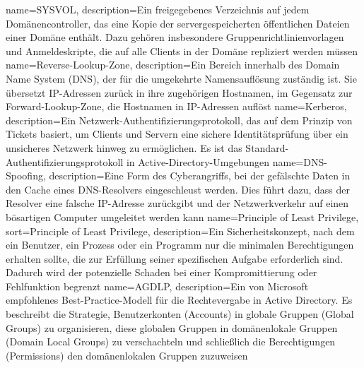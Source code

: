 {
	name={SYSVOL},
	description={Ein frei\-ge\-ge\-be\-nes Ver\-zeich\-nis auf je\-dem Do\-mä\-nen\-con\-trol\-ler, das eine Ko\-pie der ser\-ver\-ge\-spei\-cher\-ten öf\-fent\-li\-chen Da\-tei\-en ei\-ner Do\-mä\-ne ent\-hält. Da\-zu ge\-hö\-ren ins\-be\-son\-de\-re Grup\-pen\-richt\-li\-ni\-en\-vor\-la\-gen und An\-mel\-de\-skrip\-te, die auf alle Cli\-ents in der Do\-mä\-ne re\-pli\-ziert wer\-den müs\-sen}
}
{
	name={Re\-ver\-se-Look\-up-Zone},
	description={Ein Be\-reich in\-ner\-halb des Do\-main Name Sys\-tem (DNS), der für die um\-ge\-kehr\-te Na\-mens\-auf\-lö\-sung zu\-stän\-dig ist. Sie über\-setzt IP-Adres\-sen zu\-rück in ihre zu\-ge\-hö\-ri\-gen Host\-na\-men, im Ge\-gen\-satz zur For\-ward-Look\-up-Zone, die Host\-na\-men in IP-Adres\-sen auf\-löst}
}
{
	name={Ker\-be\-ros},
	description={Ein Netz\-werk-Au\-then\-ti\-fi\-zie\-rungs\-pro\-to\-koll, das auf dem Prin\-zip von Ti\-ckets ba\-siert, um Cli\-ents und Ser\-vern eine si\-che\-re Iden\-ti\-täts\-prü\-fung über ein un\-si\-che\-res Netz\-werk hin\-weg zu er\-mög\-li\-chen. Es ist das Stan\-dard-Au\-then\-ti\-fi\-zie\-rungs\-pro\-to\-koll in Ac\-tive-Di\-rec\-to\-ry-Um\-ge\-bun\-gen}
}
{
	name={DNS-Spoo\-fing},
	description={Eine Form des Cy\-ber\-an\-griffs, bei der ge\-fälsch\-te Da\-ten in den Cache ei\-nes DNS-Re\-sol\-vers ein\-ge\-schleust wer\-den. Dies führt da\-zu, dass der Re\-sol\-ver eine fal\-sche IP-Adres\-se zu\-rück\-gibt und der Netz\-werk\-ver\-kehr auf ei\-nen bös\-ar\-ti\-gen Com\-pu\-ter um\-ge\-lei\-tet wer\-den kann}
}
{
	name={Prin\-ci\-ple of Least Pri\-vi\-le\-ge},
	sort={Principle of Least Privilege},
	description={Ein Si\-cher\-heits\-kon\-zept, nach dem ein Be\-nut\-zer, ein Pro\-zess oder ein Pro\-gramm nur die mi\-ni\-ma\-len Be\-rech\-ti\-gun\-gen er\-hal\-ten soll\-te, die zur Er\-fül\-lung sei\-ner spe\-zi\-fi\-schen Auf\-ga\-be er\-for\-der\-lich sind. Da\-durch wird der po\-ten\-zi\-el\-le Scha\-den bei ei\-ner Kom\-pro\-mit\-tie\-rung oder Fehl\-funk\-ti\-on be\-grenzt}
}
{
	name={AGDLP},
	description={Ein von Mi\-cro\-soft emp\-foh\-le\-nes Best-Prac\-tice-Mo\-dell für die Rech\-te\-ver\-ga\-be in Ac\-tive Di\-rec\-to\-ry. Es be\-schreibt die Stra\-te\-gie, Be\-nut\-zer\-kon\-ten (Ac\-counts) in glo\-ba\-le Grup\-pen (Glo\-bal Groups) zu or\-ga\-ni\-sie\-ren, die\-se glo\-ba\-len Grup\-pen in do\-mä\-nen\-lo\-ka\-le Grup\-pen (Do\-main Lo\-cal Groups) zu ver\-schach\-teln und schließ\-lich die Be\-rech\-ti\-gun\-gen (Per\-mis\-sions) den do\-mä\-nen\-lo\-ka\-len Grup\-pen zu\-zu\-wei\-sen}
}
